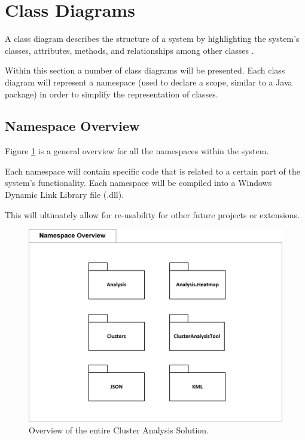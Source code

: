 \section{Class Diagrams}
A class diagram describes the structure of a system by highlighting the 
system's classes, attributes, methods, and relationships among other classes 
\citep{lunn03}.

Within this section a number of class diagrams will be presented. Each class 
diagram will represent a namespace (used to declare a scope, similar to a Java
package) in order to simplify the representation of classes. 


\subsection{Namespace Overview}
Figure \ref{fig:NSOverview} is a general overview for all the namespaces within
the system. 

Each namespace will contain specific code that is related to a certain part of 
the system's functionality. Each namespace will be compiled into a Windows 
Dynamic Link Library file (.dll). 

This will ultimately allow for re-usability for other future projects or 
extensions.

\begin{figure}[H]
  \centering
    \includegraphics[scale=1.0]{chapter7/class_diagrams/namespace_overview.png}
    \caption[Overview of the entire Cluster Analysis Solution]
            {Overview of the entire Cluster Analysis Solution.}
    \label{fig:NSOverview}
\end{figure}



